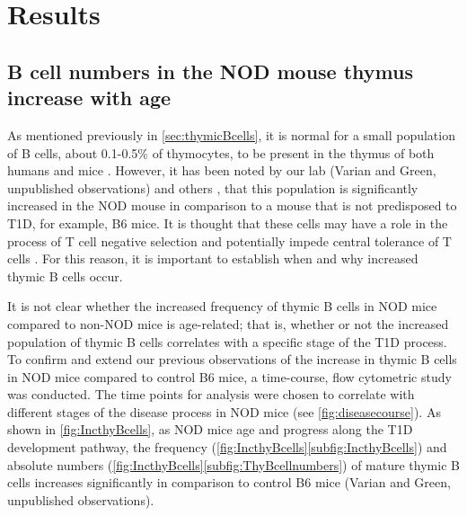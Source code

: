 
\chapter{Results}


\section{B cell numbers in the NOD mouse thymus increase with age}

As mentioned previously in \cref{sec:thymicBcells}, it is normal for a small population of B cells, about 0.1-0.5\% of thymocytes, to be present in the thymus of both humans and mice \citep{Perera2013}.
However, it has been noted by our lab (Varian and Green, unpublished observations) and others \citep{OReilly1994}, that this population is significantly increased in the NOD mouse in comparison to a mouse that is not predisposed to T1D, for example, B6 mice.
It is thought that these cells may have a role in the process of T cell negative selection and potentially impede central tolerance of T cells \citep{Starr2003, Perera2013} .
For this reason, it is important to establish when and why increased thymic B cells occur.


It is not clear whether the increased frequency of thymic B cells in NOD mice compared to non-NOD mice is age-related; that is, whether or not the increased population of thymic B cells correlates with a specific stage of the T1D process.
To confirm and extend our previous observations of the increase in thymic B cells in NOD mice compared to control B6 mice, a time-course, flow cytometric study was conducted. %
The time points for analysis were chosen to correlate with different stages of the disease process in NOD mice (see \cref{fig:diseasecourse}).
As shown in \cref{fig:IncthyBcells}, as NOD mice age and progress along the T1D development pathway, the frequency (\cref{fig:IncthyBcells}\ref{subfig:IncthyBcells}) and absolute numbers (\cref{fig:IncthyBcells}\ref{subfig:ThyBcellnumbers}) of mature thymic B cells increases significantly in comparison to control B6 mice (Varian and Green, unpublished observations). 


